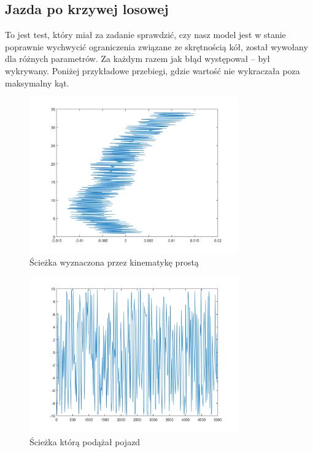 \documentclass[a4paper, 12pt]{report}
\begin{document}
			\subsection{Jazda po krzywej losowej}
				To jest test, który miał za zadanie sprawdzić, czy nasz model jest w stanie poprawnie wychwycić ograniczenia związane ze skrętnością kół, został wywołany dla różnych parametrów. Za każdym razem jak błąd występował -- był wykrywany. Poniżej przykładowe przebiegi, gdzie wartość nie wykraczała poza maksymalny kąt.
				\begin{figure}[H]
					\centering
					\includegraphics[width = 0.8\textwidth]{./AP/img/rev/gauss_in_1.png}
					\caption{Ścieżka wyznaczona przez kinematykę prostą}
				\end{figure}
				\begin{figure}[H]
					\centering
					\includegraphics[width = 0.8\textwidth]{./AP/img/rev/gauss_in_2.png}
					\caption{Ścieżka którą podążał pojazd}
				\end{figure}
\end{document}
